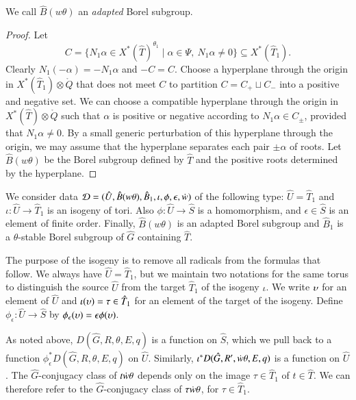 We call $\hat B(w\theta)$ an {\it adapted} Borel subgroup.

\begin{proof}  Let 
\[
C = \{N_1\alpha\in X^*(\hat T)^{\theta_1} \mid \alpha\in\Psi,\ N_1\alpha\ne 0\}
\subseteq X^*(\hat T_1).
\]
Clearly $N_1(-\alpha)= - N_1\alpha$ and $-C = C$.  Choose a hyperplane
through the origin in $X^*(\hat T_1)\otimes\ring{Q}$ that does not
meet $C$ to partition $C = C_+ \sqcup C_-$ into a positive and
negative set.  We can choose a compatible hyperplane through the
origin in $X^*(\hat T)\otimes\ring{Q}$ such that $\alpha$ is positive
or negative according to $N_1\alpha\in C_\pm$, provided that
$N_1\alpha\ne 0$.  By a small generic perturbation of this hyperplane
through the origin, we may assume that the hyperplane separates each
pair $\pm \alpha$ of roots. 
Let $\hat B(w\theta)$ be the Borel subgroup defined by $\hat T$ and
the positive roots determined by the hyperplane.
\end{proof}

We consider data $\mathcal D=(\hat U,\hat B(w\theta),\hat
B_1,\iota,\phi,\epsilon,\dot w)$ of the following type: $\hat U = \hat
T_1$ and $\iota:\hat U\to \hat T_1$ is an isogeny of tori.  Also
$\phi:\hat U\to \hat S$ is a homomorphism, and $\epsilon\in \hat S$ is
an element of finite order.  Finally, $\hat B(w\theta)$ is an
adapted Borel subgroup and $\hat B_1$ is a $\theta$-stable
Borel subgroup of $\hat G$ containing $\hat T$.


The purpose of the isogeny is to remove all radicals from the formulas that follow.
We always have $\hat U = \hat T_1$, but we maintain two notations for
the same torus to distinguish the source $\hat U$ from the target
$\hat T_1$ of the isogeny $\iota$.  We write $\upsilon$ for an element of
$\hat U$ and $\iota(\upsilon)=\tau\in \hat T_1$ for an element of the target of the
isogeny.  Define $\phi_\epsilon:\hat U\to\hat S$ by $\phi_\epsilon(\upsilon)=
\epsilon\phi(\upsilon)$.

As noted above,
$D(\hat G,R,\theta,E,q)$ is a function on $\hat S$, which we pull back
to a function $\phi^*_\epsilon D(\hat G,R,\theta,E,q)$ on $\hat U$.
Similarly, $\iota^* D(\hat G,R',\dot w \theta,E,q)$ is a function on
$\hat U$.  The $\hat G$-conjugacy class of $t\dot w \theta$ depends
only on the image $\tau\in \hat T_1$ of $t\in \hat T$.  We can
therefore refer to the $\hat G$-conjugacy class of $\tau\dot w\theta$,
for $\tau\in \hat T_1$.

